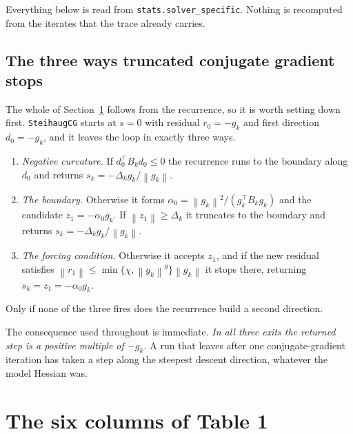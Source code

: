 \documentclass[11pt,a4paper]{article}
\providecommand{\norm}[1]{\left \lVert #1 \right \rVert}
\theoremstyle{remark}
\begin{document}
Everything below is read from \texttt{stats.solver\_specific}. Nothing is
recomputed from the iterates that the trace already carries.

\subsection{The three ways truncated conjugate gradient stops}
\label{sec: exits}

The whole of Section~\ref{sec: columns} follows from the recurrence, so it is
worth setting down first. \texttt{SteihaugCG} starts at $s = 0$ with residual
$r_0 = -g_k$ and first direction $d_0 = -g_k$, and it leaves the loop in exactly
three ways.

\begin{enumerate}[label=(E\arabic*), leftmargin=3em]
  \item \label{it: negcurv}
    \emph{Negative curvature.} If $d_0^{\!\top}B_kd_0 \leq 0$ the recurrence runs
    to the boundary along $d_0$ and returns $s_k = -\Delta_k g_k/\norm{g_k}$.
  \item \label{it: boundary}
    \emph{The boundary.} Otherwise it forms
    $\alpha_0 = \norm{g_k}^2/(g_k^{\!\top}B_kg_k)$ and the candidate
    $z_1 = -\alpha_0 g_k$. If $\norm{z_1} \geq \Delta_k$ it truncates to the
    boundary and returns $s_k = -\Delta_k g_k/\norm{g_k}$.
  \item \label{it: forcing}
    \emph{The forcing condition.} Otherwise it accepts $z_1$, and if the new
    residual satisfies
    $\norm{r_1} \leq \min\{\chi, \norm{g_k}^\theta\}\norm{g_k}$ it stops there,
    returning $s_k = z_1 = -\alpha_0 g_k$.
\end{enumerate}

Only if none of the three fires does the recurrence build a second direction.

The consequence used throughout is immediate. \emph{In all three exits the
returned step is a positive multiple of $-g_k$.} A run that leaves after one
conjugate-gradient iteration has taken a step along the steepest descent
direction, whatever the model Hessian was.

\section{The six columns of Table 1}\label{sec: columns}
\end{document}
